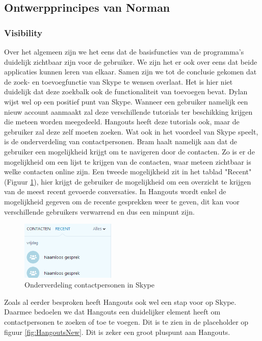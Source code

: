 \documentclass[11pt]{article}
\begin{document}
\subsection{Ontwerpprincipes van Norman}
\subsubsection{Visibility}
Over het algemeen zijn we het eens dat de basisfuncties van de programma's duidelijk zichtbaar zijn voor de gebruiker. We zijn het er ook over eens dat beide applicaties kunnen leren van elkaar. Samen zijn we tot de conclusie gekomen dat de zoek- en toevoegfunctie van Skype te wensen overlaat. Het is hier niet duidelijk dat deze zoekbalk ook de functionaliteit van toevoegen bevat. Dylan wijst wel op een positief punt van Skype. Wanneer een gebruiker namelijk een nieuw account aanmaakt zal deze verschillende tutorials ter beschikking krijgen die meteen worden meegedeeld. Hangouts heeft deze tutorials ook, maar de gebruiker zal deze zelf moeten zoeken. \newline Wat ook in het voordeel van Skype speelt, is de onderverdeling van contactpersonen. Bram haalt namelijk aan dat de gebruiker een mogelijkheid krijgt om te navigeren door de contacten. Zo is er de mogelijkheid om een lijst te krijgen van de contacten, waar meteen zichtbaar is welke contacten online zijn. Een tweede mogelijkheid zit in het tablad "Recent" (Figuur \ref{fig:SkypeTabblad}), hier krijgt de gebruiker de mogelijkheid om een overzicht te krijgen van de meest recent gevoerde conversaties. In Hangouts wordt enkel de mogelijkheid gegeven om de recente gesprekken weer te geven, dit kan voor verschillende gebruikers verwarrend en dus een minpunt zijn.
\begin{figure}
	\centering
	\includegraphics[width=0.4\textwidth]{Samen_SkypeTabblad.png}
	\caption{Onderverdeling contactpersonen in Skype}
	\label{fig:SkypeTabblad}
\end{figure}
\newline
Zoals al eerder besproken heeft Hangouts ook wel een stap voor op Skype. Daarmee bedoelen we dat Hangouts een duidelijker element heeft om contactpersonen te zoeken of toe te voegen. Dit is te zien in de placeholder op figuur \ref{fig:HangoutsNew}. Dit is zeker een groot pluspunt aan Hangouts.
\end{document}
